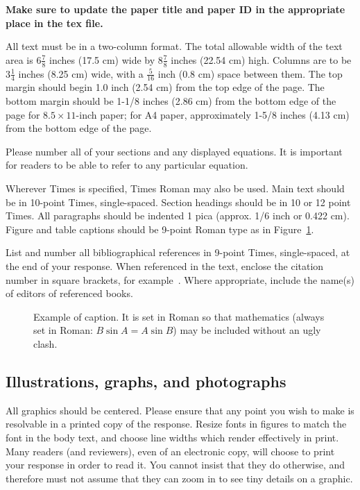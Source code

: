\documentclass[rebuttal]{cvpr}
\begin{document}
{\bf Make sure to update the paper title and paper ID in the appropriate place in the tex file.}

All text must be in a two-column format. The total allowable width of the text
area is $6\frac78$ inches (17.5 cm) wide by $8\frac78$ inches (22.54 cm) high.
Columns are to be $3\frac14$ inches (8.25 cm) wide, with a $\frac{5}{16}$ inch
(0.8 cm) space between them. The top margin should begin
1.0 inch (2.54 cm) from the top edge of the page.  The bottom margin should be
1-1/8 inches (2.86 cm) from the bottom edge of the page for $8.5 \times
11$-inch paper; for A4 paper, approximately 1-5/8 inches (4.13 cm) from the
bottom edge of the page.

Please number all of your sections and any displayed equations.  It is important
for readers to be able to refer to any particular equation.

Wherever Times is specified, Times Roman may also be used.  Main text should be
in 10-point Times, single-spaced. Section headings should be in 10 or 12 point
Times.  All paragraphs should be indented 1 pica (approx. 1/6 inch or 0.422
cm).  Figure and table captions should be 9-point Roman type as in
Figure~\ref{fig:onecol}.


List and number all bibliographical references in 9-point Times, single-spaced,
at the end of your response. When referenced in the text, enclose the citation
number in square brackets, for example~\cite{Authors14}.  Where appropriate,
include the name(s) of editors of referenced books.

\begin{figure}[t]
\begin{center}
\fbox{\rule{0pt}{1in} \rule{0.9\linewidth}{0pt}}
\end{center}
   \caption{Example of caption.  It is set in Roman so that mathematics
   (always set in Roman: $B \sin A = A \sin B$) may be included without an
   ugly clash.}
\label{fig:long}
\label{fig:onecol}
\end{figure}


\subsection{Illustrations, graphs, and photographs}

All graphics should be centered.  Please ensure that any point you wish to make is resolvable in a printed copy of the response.  Resize fonts in figures to match the font in the body text, and choose line widths which render effectively in print.  Many readers (and reviewers), even of an electronic copy, will choose to print your response in order to read it.  You cannot insist that they do otherwise, and therefore must not assume that they can zoom in to see tiny details on a graphic.
\end{document}
